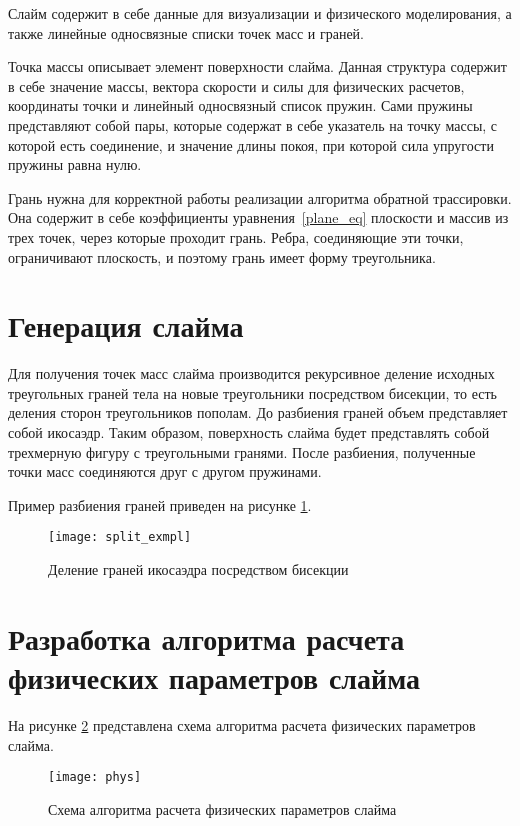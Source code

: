 Слайм содержит в себе данные для визуализации и физического моделирования, а также линейные односвязные списки точек масс и граней.

Точка массы описывает элемент поверхности слайма. Данная структура содержит в себе значение массы, вектора скорости и силы для физических расчетов, координаты точки и линейный односвязный список пружин. Сами пружины представляют собой пары, которые содержат в себе указатель на точку массы, с которой есть соединение, и значение длины покоя, при которой сила упругости пружины равна нулю.

Грань нужна для корректной работы реализации алгоритма обратной трассировки. Она содержит в себе коэффициенты уравнения~\eqref{plane_eq} плоскости и массив из трех точек, через которые проходит грань. Ребра, соединяющие эти точки, ограничивают плоскость, и поэтому грань имеет форму треугольника.

\section{Генерация слайма}

Для получения точек масс слайма производится рекурсивное
деление исходных треугольных граней тела на новые треугольники посредством
бисекции, то есть деления сторон треугольников пополам. До разбиения граней
объем представляет собой икосаэдр. Таким образом, поверхность слайма будет представлять собой трехмерную фигуру с треугольными гранями. После разбиения, полученные точки масс соединяются друг с другом пружинами.

Пример разбиения граней приведен на рисунке \ref{split_exmpl}.

\begin{figure}[H]
	\centering
	\texttt{[image: split\_exmpl]}
	\caption{Деление граней икосаэдра посредством бисекции}
	\label{split_exmpl}
\end{figure}

\section{Разработка алгоритма расчета физических параметров слайма}

На рисунке \ref{phys} представлена схема алгоритма расчета физических параметров слайма.

\begin{figure}[H]
	\centering
	\texttt{[image: phys]}
	\caption{Схема алгоритма расчета физических параметров слайма}
	\label{phys}
\end{figure}

